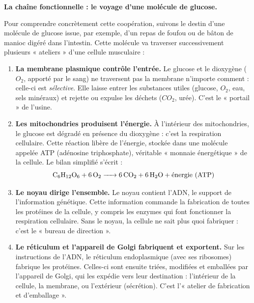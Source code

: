 \documentclass[11pt]{article}
\newcommand{\cle}[1]{{\popxbold\color{popdark}#1}}
\begin{document}
\textbf{La chaîne fonctionnelle : le voyage d'une molécule de glucose.}\par

Pour comprendre concrètement cette coopération, suivons le destin d'une molécule de \cle{glucose} issue, par exemple, d'un repas de foufou ou de bâton de manioc digéré dans l'intestin. Cette molécule va traverser successivement plusieurs « ateliers » d'une cellule musculaire :

\begin{enumerate}
\item \textbf{La membrane plasmique contrôle l'entrée.} Le glucose et le dioxygène ($O_2$, apporté par le sang) ne traversent pas la membrane n'importe comment : celle-ci est \emph{sélective}. Elle laisse entrer les substances utiles (glucose, $O_2$, eau, sels minéraux) et rejette ou expulse les déchets ($CO_2$, urée). C'est le « portail » de l'usine.
\item \textbf{Les mitochondries produisent l'énergie.} À l'intérieur des mitochondries, le glucose est dégradé en présence du dioxygène : c'est la \cle{respiration cellulaire}. Cette réaction libère de l'énergie, stockée dans une molécule appelée \cle{ATP} (adénosine triphosphate), véritable « monnaie énergétique » de la cellule. Le bilan simplifié s'écrit :
\[ \ce{C6H12O6 + 6O2 -> 6CO2 + 6H2O} + \text{énergie (ATP)} \]
\item \textbf{Le noyau dirige l'ensemble.} Le noyau contient l'\cle{ADN}, le support de l'information génétique. Cette information commande la fabrication de toutes les protéines de la cellule, y compris les enzymes qui font fonctionner la respiration cellulaire. Sans le noyau, la cellule ne sait plus quoi fabriquer : c'est le « bureau de direction ».
\item \textbf{Le réticulum et l'appareil de Golgi fabriquent et exportent.} Sur les instructions de l'ADN, le \cle{réticulum endoplasmique} (avec ses ribosomes) fabrique les protéines. Celles-ci sont ensuite triées, modifiées et emballées par l'\cle{appareil de Golgi}, qui les expédie vers leur destination : l'intérieur de la cellule, la membrane, ou l'extérieur (sécrétion). C'est l'« atelier de fabrication et d'emballage ».
\end{enumerate}
\end{document}
